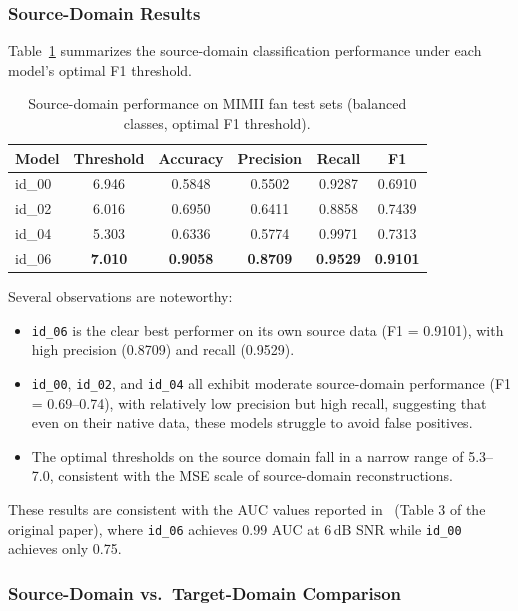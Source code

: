 \documentclass[12pt, a4paper]{article}
\begin{document}
\subsubsection{Source-Domain Results}

Table~\ref{tab:source-results} summarizes the source-domain classification performance under each model's optimal F1 threshold.

\begin{table}[htbp]
\centering
\caption{Source-domain performance on MIMII fan test sets (balanced classes, optimal F1 threshold).}
\label{tab:source-results}
\begin{tabular}{lccccc}
\toprule
Model & Threshold & Accuracy & Precision & Recall & F1 \\
\midrule
id\_00 & 6.946 & 0.5848 & 0.5502 & 0.9287 & 0.6910 \\
id\_02 & 6.016 & 0.6950 & 0.6411 & 0.8858 & 0.7439 \\
id\_04 & 5.303 & 0.6336 & 0.5774 & 0.9971 & 0.7313 \\
id\_06 & \textbf{7.010} & \textbf{0.9058} & \textbf{0.8709} & \textbf{0.9529} & \textbf{0.9101} \\
\bottomrule
\end{tabular}
\end{table}

Several observations are noteworthy:
\begin{itemize}
    \item \texttt{id\_06} is the clear best performer on its own source data (F1 = 0.9101), with high precision (0.8709) and recall (0.9529).
    \item \texttt{id\_00}, \texttt{id\_02}, and \texttt{id\_04} all exhibit moderate source-domain performance (F1 = 0.69--0.74), with relatively low precision but high recall, suggesting that even on their native data, these models struggle to avoid false positives.
    \item The optimal thresholds on the source domain fall in a narrow range of 5.3--7.0, consistent with the MSE scale of source-domain reconstructions.
\end{itemize}

These results are consistent with the AUC values reported in~\cite{purohit2019mimii} (Table 3 of the original paper), where \texttt{id\_06} achieves 0.99 AUC at 6\,dB SNR while \texttt{id\_00} achieves only 0.75.

\subsubsection{Source-Domain vs.\ Target-Domain Comparison}
\end{document}

